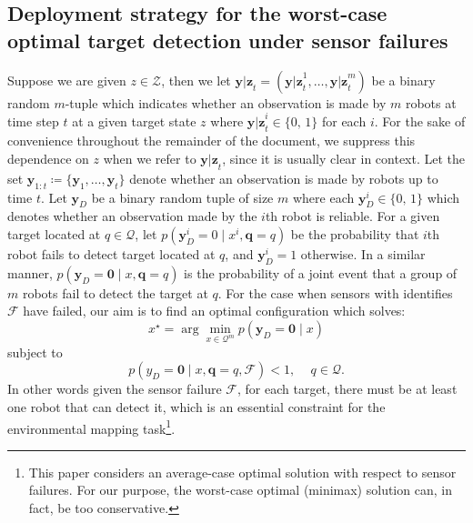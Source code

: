 \documentclass[letterpaper, 10 pt, conference]{ieeeconf}
\begin{document}
\subsection{Deployment strategy for the worst-case optimal target detection under sensor failures}
\label{sec:sec23}
Suppose we are given $z \in \mathcal{Z}$, then we let $\bm{y|z}_{t}=(\bm{y|z}_{t}^{1},\dots,\bm{y|z}_{t}^{m})$ be a binary random $m$-tuple which indicates whether an observation is made by $m$ robots at time step $t$ at a given target state $z$ where $\bm{y|z}_{t}^{i} \in \lbrace 0,\,1 \rbrace$ for each $i$.
For the sake of convenience throughout the remainder of the document, we suppress this dependence on $z$ when we refer to $\bm{y|z}_{t}$, since it is usually clear in context.
Let the set $\bm{y}_{1:t}\coloneqq \lbrace \bm{y}_1,\dots,\bm{y}_t \rbrace$ denote whether an observation is made by robots up to time $t$. 
Let $\bm{y}_{D}$ be a binary random tuple of size $m$ where each $\bm{y}_{D}^i \in \lbrace 0,\,1 \rbrace$ which denotes whether an observation made by the $i$th robot is reliable.
For a given target located at $q \in \mathcal{Q}$, let $
p(\bm{y}_{D}^i =0 \mid x^i,\bm{q} = q)
$
be the probability that $i$th robot fails to detect target located at $q$, and $\bm{y}_{D}^i = 1$ otherwise.
In a similar manner, $p(\bm{y}_{D}=\bm{0} \mid x, \bm{q}=q)$ is the probability of a joint event that a group of $m$ robots fail to detect the target at $q$. 
For the case when sensors with identifies $\mathcal{F}$ have failed, our aim is to find an optimal configuration which solves:
\begin{equation}
x^{\star} = \arg
\min_{x \in \mathcal{Q}^m} 
p(\bm{y}_{D} = \bm{0} \mid x)
\label{mainprob}
\end{equation}
subject to
\begin{equation}
p(y_D = \bm{0} \mid x,\bm{q}=q,\mathcal{F}) <1, \,\,\,\,\,\,\, q \in \mathcal{Q}.
\label{const}
\end{equation}
In other words given the sensor failure $\mathcal{F}$, for each target, there must be at least one robot that can detect it, which is an essential constraint for the environmental mapping task\footnote{This paper considers an average-case optimal solution with respect to sensor failures. For our purpose, the worst-case optimal (minimax) solution can, in fact, be too conservative.}.
\end{document}
